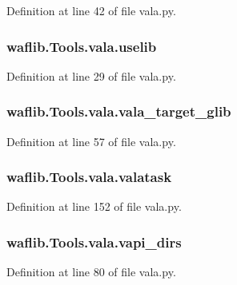 Definition at line 42 of file vala.\+py.

\subsubsection[{\texorpdfstring{uselib}{uselib}}]{\setlength{\rightskip}{0pt plus 5cm}waflib.\+Tools.\+vala.\+uselib}\hypertarget{namespacewaflib_1_1_tools_1_1vala_ae1307477fe2c49e6c3c5b324108e7e9f}{}\label{namespacewaflib_1_1_tools_1_1vala_ae1307477fe2c49e6c3c5b324108e7e9f}


Definition at line 29 of file vala.\+py.

\subsubsection[{\texorpdfstring{vala\+\_\+target\+\_\+glib}{vala_target_glib}}]{\setlength{\rightskip}{0pt plus 5cm}waflib.\+Tools.\+vala.\+vala\+\_\+target\+\_\+glib}\hypertarget{namespacewaflib_1_1_tools_1_1vala_aeb3f063bb00b999bcee84bfb8b9f6d29}{}\label{namespacewaflib_1_1_tools_1_1vala_aeb3f063bb00b999bcee84bfb8b9f6d29}


Definition at line 57 of file vala.\+py.

\subsubsection[{\texorpdfstring{valatask}{valatask}}]{\setlength{\rightskip}{0pt plus 5cm}waflib.\+Tools.\+vala.\+valatask}\hypertarget{namespacewaflib_1_1_tools_1_1vala_ad126b4a64437383ddaf43ac3b47df2c8}{}\label{namespacewaflib_1_1_tools_1_1vala_ad126b4a64437383ddaf43ac3b47df2c8}


Definition at line 152 of file vala.\+py.

\subsubsection[{\texorpdfstring{vapi\+\_\+dirs}{vapi_dirs}}]{\setlength{\rightskip}{0pt plus 5cm}waflib.\+Tools.\+vala.\+vapi\+\_\+dirs}\hypertarget{namespacewaflib_1_1_tools_1_1vala_aa257ce1418040461bced7d2d05bdaf75}{}\label{namespacewaflib_1_1_tools_1_1vala_aa257ce1418040461bced7d2d05bdaf75}


Definition at line 80 of file vala.\+py.

